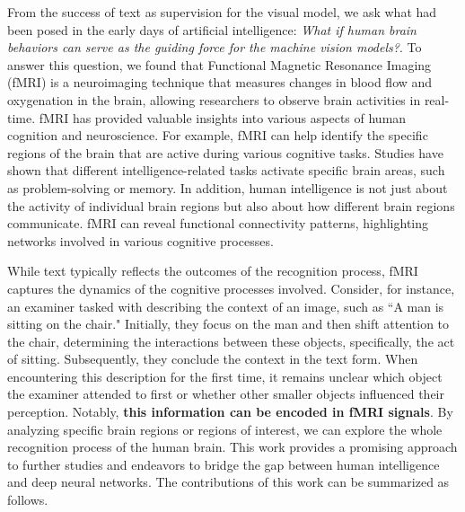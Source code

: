 From the success of text as supervision for the visual model, we ask what had been posed in the early days of artificial intelligence: \textit{What if human brain behaviors can serve as the guiding force for the machine vision models?}. To answer this question, we found that Functional Magnetic Resonance Imaging (fMRI) is a neuroimaging technique that measures changes in blood flow and oxygenation in the brain, allowing researchers to observe brain activities in real-time. fMRI has provided valuable insights into various aspects of human cognition and neuroscience. For example,  fMRI can help identify the specific regions of the brain that are active during various cognitive tasks. Studies have shown that different intelligence-related tasks activate specific brain areas, such as problem-solving or memory. In addition, human intelligence is not just about the activity of individual brain regions but also about how different brain regions communicate. fMRI can reveal functional connectivity patterns, highlighting networks involved in various cognitive processes. 

While text typically reflects the outcomes of the recognition process, fMRI captures the dynamics of the cognitive processes involved. Consider, for instance, an examiner tasked with describing the context of an image, such as ``A man is sitting on the chair." Initially, they focus on the man and then shift attention to the chair, determining the interactions between these objects, specifically, the act of sitting. Subsequently, they conclude the context in the text form. When encountering this description for the first time, it remains unclear which object the examiner attended to first or whether other smaller objects influenced their perception. Notably, \textbf{this information can be encoded in fMRI signals}. By analyzing specific brain regions or regions of interest,  we can explore the whole recognition process of the human brain.
This work provides a promising approach to further studies and endeavors to bridge the gap between human intelligence and deep neural networks. 
The contributions of this work can be summarized as follows.

